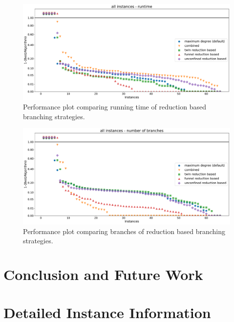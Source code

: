 \documentclass[a4paper,UKenglish,cleveref, autoref, thm-restate]{lipics-v2021}
\begin{document}
\begin{figure}[t]
  \includegraphics[width=\textwidth]{plots/all_reduction_based_time}
  \caption{Performance plot comparing running time of reduction based branching strategies.}
  \label{fig:all_reduction_time}
\end{figure}

\begin{figure}[t]
  \includegraphics[width=\textwidth]{plots/all_reduction_based_branch}
  \caption{Performance plot comparing branches of reduction based branching strategies.}
  \label{fig:all_reduction_branch}
\end{figure}


\section{Conclusion and Future Work}


\FloatBarrier


\newpage

\appendix

\section{Detailed Instance Information}
\label{app:instances}
\end{document}
